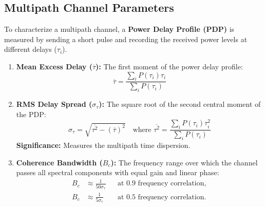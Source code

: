 \documentclass[12pt,a4paper]{article}
\begin{document}
\subsection{Multipath Channel Parameters}
To characterize a multipath channel, a \textbf{Power Delay Profile (PDP)} is measured by sending a short pulse and recording the received power levels at different delays ($\tau_i$).
\begin{tcolorbox}[formulabox, title={\textbf{Multipath Spread Metrics}}]
\begin{enumerate}[leftmargin=*, itemsep=4pt, label=\textbf{\arabic*.}]
  \item \textbf{Mean Excess Delay ($\overline{\tau}$):} The first moment of the power delay profile:
    \begin{equation}
      \overline{\tau} = \frac{\sum_i P(\tau_i) \tau_i}{\sum_i P(\tau_i)}
    \end{equation}
  \item \textbf{RMS Delay Spread ($\sigma_\tau$):} The square root of the second central moment of the PDP:
    \begin{equation}
      \sigma_\tau = \sqrt{\overline{\tau^2} - (\overline{\tau})^2} \quad \text{where } \overline{\tau^2} = \frac{\sum_i P(\tau_i) \tau_i^2}{\sum_i P(\tau_i)}
    \end{equation}
    \textbf{Significance:} Measures the multipath time dispersion.
  \item \textbf{Coherence Bandwidth ($B_c$):} The frequency range over which the channel passes all spectral components with equal gain and linear phase:
    \begin{equation}
      \begin{aligned}
        B_c &\approx \frac{1}{50\sigma_\tau} && \text{at } 0.9 \text{ frequency correlation},\\[3pt]
        B_c &\approx \frac{1}{5\sigma_\tau} && \text{at } 0.5 \text{ frequency correlation}.
      \end{aligned}
    \end{equation}
\end{enumerate}
\end{tcolorbox}
\end{document}
